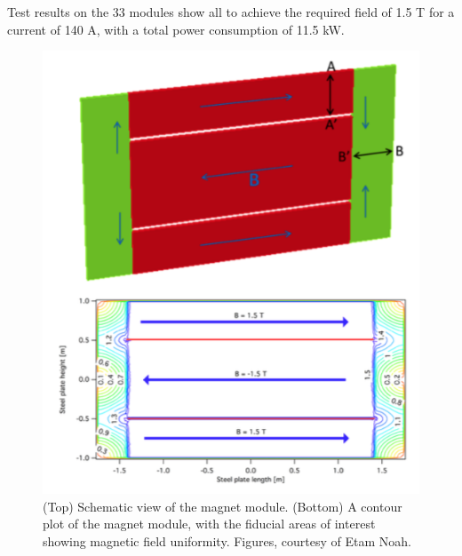 Test results on the 33 modules show all to achieve the required field of 1.5 T for a current of 140 A, with a total power consumption of 11.5 kW.


\begin{figure}[h!]
\centering
\includegraphics[width=\textwidth]{figures/Mfield.png}
\caption{(Top) Schematic view of the magnet module. (Bottom) A contour plot of the magnet module, with the fiducial areas of interest showing magnetic field uniformity. Figures,  courtesy of Etam Noah.}
\label{fig:mField}
\end{figure}

